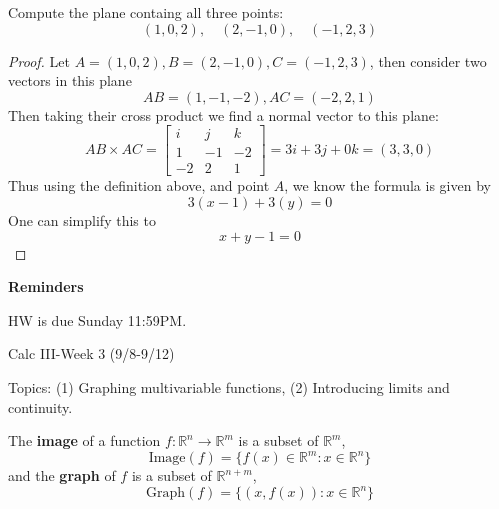 \documentclass[openany]{book}
\newcommand{\R}{\mathbb{R}}
\begin{document}
\begin{prob}
    Compute the plane containg all three points:
    \begin{equation*}
        (1,0,2), \quad (2, -1, 0), \quad (-1, 2, 3)
    \end{equation*}
\end{prob}
\begin{proof}
    Let $A=(1,0,2), B=(2, -1, 0), C=(-1, 2, 3)$, then consider two vectors in this plane 
    \begin{equation*}
        AB=(1,-1,-2), AC=(-2,2,1)
    \end{equation*}
    Then taking their cross product we find a normal vector to this plane:
    \begin{equation*}
        AB\times AC=\begin{bmatrix}
            i&j&k\\
            1&-1&-2\\
            -2&2&1
        \end{bmatrix}=3i+3j+0k=(3,3,0)
    \end{equation*}
    Thus using the definition above, and point $A$, we know the formula is given by 
    \begin{equation*}
        3(x-1)+3(y)=0
    \end{equation*}
    One can simplify this to 
    \begin{equation*}
        x+y-1=0
    \end{equation*}
\end{proof}

\noindent
\textbf{Reminders}

HW is due Sunday 11:59PM.



\newpage



\begin{center}
    \Large Calc III-Week 3 (9/8-9/12)
\end{center}

\renewcommand\thesection{\arabic{section}}

\noindent
Topics: (1) Graphing multivariable functions, (2) Introducing limits and continuity.

\begin{defn}[graph]
    The \textbf{image} of a function $f: \R^n\to\R^m$ is a subset of $\R^m$,
    \begin{equation*}
        \text{Image}(f)=\{f(x)\in\R^m: x\in\R^n\}
    \end{equation*}
    and the \textbf{graph} of $f$ is a subset of $\R^{n+m}$,
    \begin{equation*}
        \text{Graph}(f)=\{(x,f(x)): x\in\R^n\}
    \end{equation*}
\end{defn}
\end{document}
